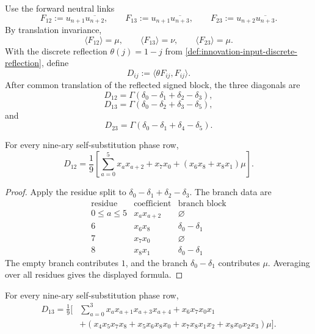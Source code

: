 \begin{definition}
\label{def:innovation-input-nine-complex-forward-link-diagonals}
Use the forward neutral links
$$
F_{12}:=u_{n+1}\overline{u_{n+2}},
\qquad
F_{13}:=u_{n+1}\overline{u_{n+3}},
\qquad
F_{23}:=u_{n+2}\overline{u_{n+3}}.
$$
By translation invariance,
$$
\langle F_{12}\rangle=\mu,
\qquad
\langle F_{13}\rangle=\nu,
\qquad
\langle F_{23}\rangle=\mu.
$$
With the discrete reflection $\theta(j)=1-j$ from
\autoref{def:innovation-input-discrete-reflection}, define
$$
D_{ij}:=\langle\theta F_{ij},F_{ij}\rangle.
$$
After common translation of the reflected signed block, the three
diagonals are
$$
D_{12}
=
\Gamma(\delta_0-\delta_1+\delta_2-\delta_3),
$$
$$
D_{13}
=
\Gamma(\delta_0-\delta_2+\delta_3-\delta_5),
$$
and
$$
D_{23}
=
\Gamma(\delta_0-\delta_1+\delta_4-\delta_5).
$$
\end{definition}

\begin{theorem}
\label{thm:innovation-input-nine-complex-dtwelve-formula}
For every nine-ary self-substitution phase row,
$$
D_{12}
=
\frac19
\left[
\sum_{a=0}^{5}x_ax_{a+2}
+
x_7x_0
+
(x_6x_8+x_8x_1)\mu
\right].
$$
\end{theorem}

\begin{proof}
Apply the residue split to
$\delta_0-\delta_1+\delta_2-\delta_3$. The branch data are
$$
\begin{array}{c|c|c}
\text{residue} & \text{coefficient} & \text{branch block}\\
\hline
0\le a\le5 & x_ax_{a+2} & \varnothing\\
6 & x_6x_8 & \delta_0-\delta_1\\
7 & x_7x_0 & \varnothing\\
8 & x_8x_1 & \delta_0-\delta_1
\end{array}
$$
The empty branch contributes $1$, and the branch
$\delta_0-\delta_1$ contributes $\mu$. Averaging over all residues gives
the displayed formula.
\end{proof}

\begin{theorem}
\label{thm:innovation-input-nine-complex-dthirteen-formula}
For every nine-ary self-substitution phase row,
$$
\begin{aligned}
D_{13}
=
\frac19\Big[
&\sum_{a=0}^{3}x_ax_{a+1}x_{a+3}x_{a+4}
+
x_6x_7x_0x_1\\
&+
\left(
x_4x_5x_7x_8
+
x_5x_6x_8x_0
+
x_7x_8x_1x_2
+
x_8x_0x_2x_3
\right)\mu
\Big].
\end{aligned}
$$
\end{theorem}


